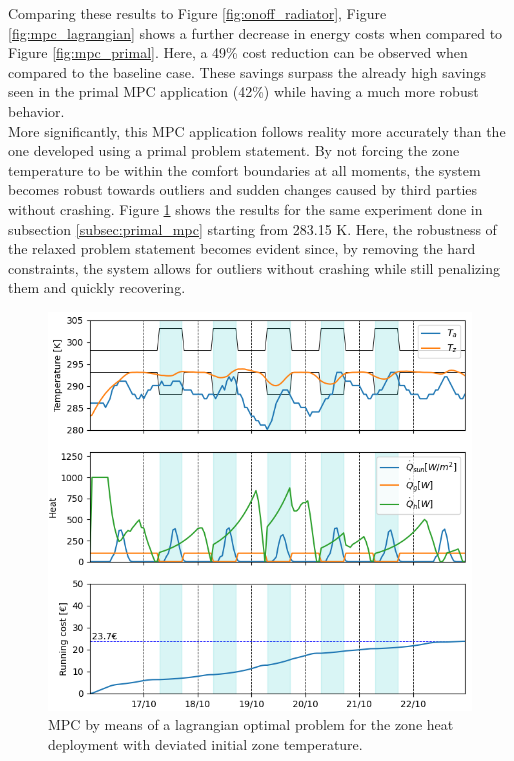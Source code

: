 Comparing these results to Figure \ref{fig:onoff_radiator}, Figure \ref{fig:mpc_lagrangian} shows a further decrease in energy costs when compared to Figure \ref{fig:mpc_primal}. Here, a 49\% cost reduction can be observed when compared to the baseline case. These savings surpass the already high savings seen in the primal MPC application (42\%) while having a much more robust behavior.\\

More significantly, this MPC application follows reality more accurately than the one developed using a primal problem statement. By not forcing the zone temperature to be within the comfort boundaries at all moments, the system becomes robust towards outliers and sudden changes caused by third parties without crashing. Figure \ref{fig:mpc_lagrangian_Tstart} shows the results for the same experiment done in subsection \ref{subsec:primal_mpc} starting from 283.15 K. Here, the robustness of the relaxed problem statement becomes evident since, by removing the hard constraints, the system allows for outliers without crashing while still penalizing them and quickly recovering.

\begin{figure}[H]
\centering
\includegraphics[scale=0.8]{images/mpc_lagrangian_Tstart.png}
\caption{MPC by means of a lagrangian optimal problem for the zone heat deployment with deviated initial zone temperature.}
\label{fig:mpc_lagrangian_Tstart}
\end{figure}